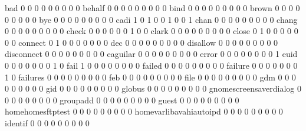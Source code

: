 \documentclass[compress,8pt]{beamer}
\begin{document}
\begin{frame}
\begin{Schunk}
  bad                                        0   0   0   0   0   0   0   0   0
  behalf                                     0   0   0   0   0   0   0   0   0
  bind                                       0   0   0   0   0   0   0   0   0
  brown                                      0   0   0   0   0   0   0   0   0
  bye                                        0   0   0   0   0   0   0   0   0
  cadi                                       1   0   1   0   0   1   0   0   1
  chan                                       0   0   0   0   0   0   0   0   0
  chang                                      0   0   0   0   0   0   0   0   0
  check                                      0   0   0   0   0   0   1   0   0
  clark                                      0   0   0   0   0   0   0   0   0
  close                                      0   1   0   0   0   0   0   0   0
  connect                                    0   1   0   0   0   0   0   0   0
  dec                                        0   0   0   0   0   0   0   0   0
  disallow                                   0   0   0   0   0   0   0   0   0
  disconnect                                 0   0   0   0   0   0   0   0   0
  eaguilar                                   0   0   0   0   0   0   0   0   0
  error                                      0   0   0   0   0   0   0   0   1
  euid                                       0   0   0   0   0   0   0   1   0
  fail                                       1   0   0   0   0   0   0   0   0
  failed                                     0   0   0   0   0   0   0   0   0
  failure                                    0   0   0   0   0   0   0   1   0
  failures                                   0   0   0   0   0   0   0   0   0
  feb                                        0   0   0   0   0   0   0   0   0
  file                                       0   0   0   0   0   0   0   0   0
  gdm                                        0   0   0   0   0   0   0   0   0
  gid                                        0   0   0   0   0   0   0   0   0
  globus                                     0   0   0   0   0   0   0   0   0
  gnomescreensaverdialog                     0   0   0   0   0   0   0   0   0
  groupadd                                   0   0   0   0   0   0   0   0   0
  guest                                      0   0   0   0   0   0   0   0   0
  homehomesftptest                           0   0   0   0   0   0   0   0   0
  homevarlibavahiautoipd                     0   0   0   0   0   0   0   0   0
  identif                                    0   0   0   0   0   0   0   0   0

\end{Schunk}
\end{frame}
\end{document}
